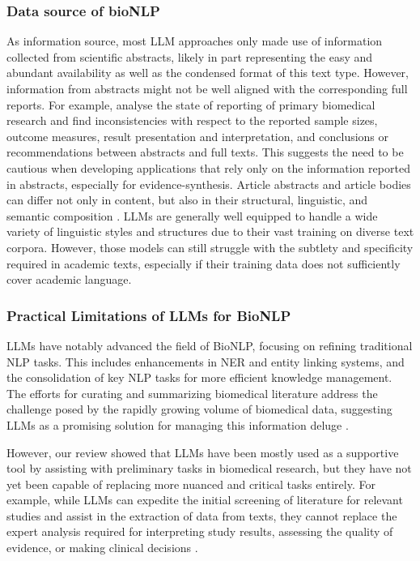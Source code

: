 \documentclass[fleqn,10pt]{olplainarticle}
\begin{document}
\subsubsection*{Data source of bioNLP}

As information source, most LLM approaches only made use of information collected from scientific abstracts, likely in part representing the easy and abundant availability as well as the condensed format of this text type. However, information from abstracts might not be well aligned with the corresponding full reports. For example, \cite{li2017scoping} analyse the state of reporting of primary biomedical research and find inconsistencies with respect to the reported sample sizes, outcome measures, result presentation and interpretation, and conclusions or recommendations between abstracts and full texts. This suggests the need to be cautious when developing applications that rely only on the information reported in abstracts, especially for evidence-synthesis. Article abstracts and article bodies can differ not only in content, but also in their structural, linguistic, and semantic composition \citep{cohen2010structural}. LLMs are generally well equipped to handle a wide variety of linguistic styles and structures due to their vast training on diverse text corpora. However, those models can still struggle with the subtlety and specificity required in academic texts, especially if their training data does not sufficiently cover academic language. %

\subsubsection*{Practical Limitations of LLMs for BioNLP}

LLMs have notably advanced the field of BioNLP, focusing on refining traditional NLP tasks. This includes enhancements in NER and entity linking systems, and the consolidation of key NLP tasks for more efficient knowledge management. The efforts for curating and summarizing biomedical literature address the challenge posed by the rapidly growing volume of biomedical data, suggesting LLMs as a promising solution for managing this information deluge \citep{ji2020bert,ivanisenko2022new,naseem2022benchmarking,bornmann2015growth,ineichen2023data}.

However, our review showed that LLMs have been mostly used as a supportive tool by assisting with preliminary tasks in biomedical research, but they have not yet been capable of replacing more nuanced and critical tasks entirely. For example, while LLMs can expedite the initial screening of literature for relevant studies and assist in the extraction of data from texts, they cannot replace the expert analysis required for interpreting study results, assessing the quality of evidence, or making clinical decisions \citep{khraisha2023can,tang2023evaluating}.
\end{document}
